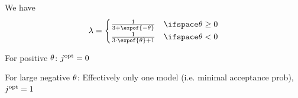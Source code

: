 \begin{example}

    We have
    \begin{align*}
        \acceptanceprob
        = \begin{cases}
              \frac{1}{3+\expof{-\canparam}} & \ifspace \canparam \geq 0 \\
              \frac{1}{3\cdot\expof{\canparam}+1} & \ifspace \canparam < 0
        \end{cases}
    \end{align*}

    For positive $\theta$:
    $j^{\mathrm{opt}}=0$

    For large negative $\theta$:
    Effectively only one model (i.e. minimal acceptance prob), $j^{\mathrm{opt}}=1$

\end{example}